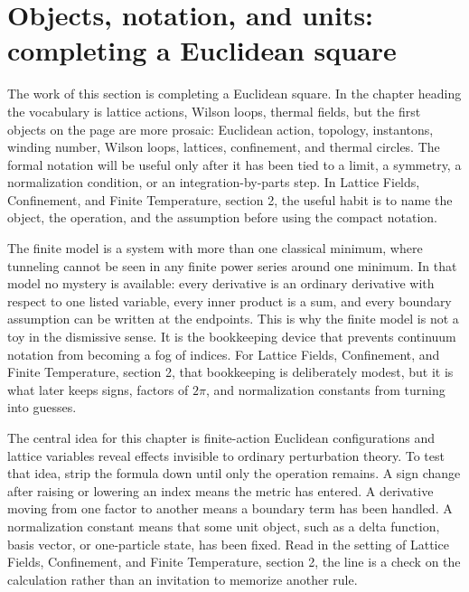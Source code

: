 \section{Objects, notation, and units: completing a Euclidean square}













The work of this section is completing a Euclidean square.  In the chapter heading the vocabulary is lattice actions, Wilson loops, thermal fields, but the first objects on the page are more prosaic: Euclidean action, topology, instantons, winding number, Wilson loops, lattices, confinement, and thermal circles.  The formal notation will be useful only after it has been tied to a limit, a symmetry, a normalization condition, or an integration-by-parts step.  In Lattice Fields, Confinement, and Finite Temperature, section 2, the useful habit is to name the object, the operation, and the assumption before using the compact notation.

The finite model is a system with more than one classical minimum, where tunneling cannot be seen in any finite power series around one minimum.  In that model no mystery is available: every derivative is an ordinary derivative with respect to one listed variable, every inner product is a sum, and every boundary assumption can be written at the endpoints.  This is why the finite model is not a toy in the dismissive sense.  It is the bookkeeping device that prevents continuum notation from becoming a fog of indices.  For Lattice Fields, Confinement, and Finite Temperature, section 2, that bookkeeping is deliberately modest, but it is what later keeps signs, factors of \(2\pi\), and normalization constants from turning into guesses.

The central idea for this chapter is finite-action Euclidean configurations and lattice variables reveal effects invisible to ordinary perturbation theory.  To test that idea, strip the formula down until only the operation remains.  A sign change after raising or lowering an index means the metric has entered.  A derivative moving from one factor to another means a boundary term has been handled.  A normalization constant means that some unit object, such as a delta function, basis vector, or one-particle state, has been fixed.  Read in the setting of Lattice Fields, Confinement, and Finite Temperature, section 2, the line is a check on the calculation rather than an invitation to memorize another rule.


